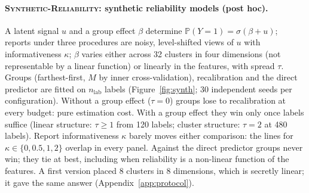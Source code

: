 \documentclass[11pt]{article}
\theoremstyle{definition}
\theoremstyle{remark}
\renewcommand{\P}{\mathbb{P}}
\newcommand{\1}{\mathbf{1}}
\newcommand{\expname}[1]{\textsc{#1}}
\begin{document}
\paragraph{\expname{Synthetic-Reliability}: synthetic reliability models (post hoc).} A latent signal $u$ and a group
effect $\beta$ determine $\P(Y=1)=\sigma(\beta+u)$; reports under three procedures are noisy,
level-shifted views of $u$ with informativeness $\kappa$; $\beta$ varies either across 32 clusters in
four dimensions (not representable by a linear function) or linearly in the features, with spread
$\tau$. Groups (farthest-first, $M$ by inner cross-validation), recalibration and the direct predictor
are fitted on $n_{\mathrm{lab}}$ labels (Figure~\ref{fig:synth}; 30 independent seeds per
configuration). Without a group effect ($\tau=0$) groups lose to recalibration at every budget: pure
estimation cost. With a group effect they win only once labels suffice (linear structure: $\tau\ge1$
from 120 labels; cluster structure: $\tau=2$ at 480 labels). Report informativeness $\kappa$ barely
moves either comparison: the lines for $\kappa\in\{0,0.5,1,2\}$ overlap in every panel. Against the
direct predictor groups never win; they tie at best, including when reliability is a non-linear
function of the features. A first version placed 8 clusters in 8 dimensions, which is secretly linear;
it gave the same answer (Appendix~\ref{app:protocol}).
\end{document}

